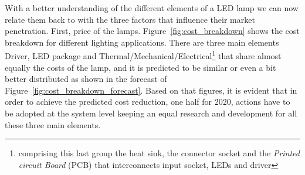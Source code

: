 With a better understanding of the different elements of a LED lamp we can now relate them back to with the three factors that influence their market penetration. First, price of the lamps. Figure~\ref{fig:cost_breakdown} shows the cost breakdown for different lighting applications. There are three main elements Driver, LED package and Thermal/Mechanical/Electrical\footnote{comprising this last group the heat sink, the connector socket and the \emph{Printed circuit Board} (PCB) that interconnects input socket, LEDs and driver} that share  almost equally the costs of the lamp, and it is predicted to be similar or even a bit better distributed as shown in the forecast of Figure~\ref{fig:cost_breakdown_forecast}. Based on that figures, it is evident that in order to achieve the predicted cost reduction, one half for 2020, actions have to be adopted at the system level keeping an equal research and development for all these three main elements.

